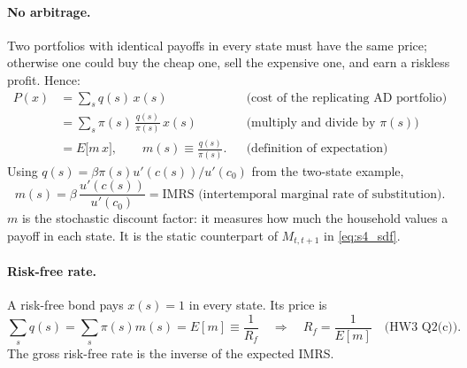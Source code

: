 \paragraph{No arbitrage.} Two portfolios with identical payoffs in every state must have the same price; otherwise one could buy the cheap one, sell the expensive one, and earn a riskless profit. Hence:
\begin{align*}
  P(x) &= \sum_s q(s)\,x(s) && \text{(cost of the replicating AD portfolio)}\\
  &= \sum_s \pi(s)\,\frac{q(s)}{\pi(s)}\,x(s) && \text{(multiply and divide by $\pi(s)$)}\\
  &= E\big[m\,x\big],\qquad m(s)\equiv\frac{q(s)}{\pi(s)}. && \text{(definition of expectation)}
\end{align*}
Using $q(s)=\beta\pi(s)u'(c(s))/u'(c_0)$ from the two-state example,
\[
  m(s)=\beta\,\frac{u'(c(s))}{u'(c_0)} = \text{IMRS (intertemporal marginal rate of substitution)}.
\]
$m$ is the stochastic discount factor: it measures how much the household values a payoff in each state. It is the static counterpart of $M_{t,t+1}$ in \eqref{eq:s4_sdf}.

\paragraph{Risk-free rate.} A risk-free bond pays $x(s)=1$ in every state. Its price is
\[
  \sum_sq(s)=\sum_s\pi(s)m(s)=E[m]\equiv\frac{1}{R_f}
  \quad\Longrightarrow\quad R_f=\frac{1}{E[m]} \quad\text{(HW3 Q2(c))}.
\]
The gross risk-free rate is the inverse of the expected IMRS.

